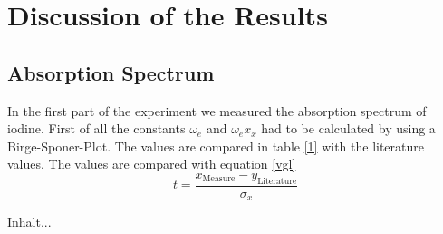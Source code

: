 \section{Discussion of the Results}
\subsection{Absorption Spectrum}
In the first part of the experiment we measured the absorption spectrum of iodine. First of all the constants $\omega_e$ and $\omega_ex_x$ had to be calculated by using a Birge-Sponer-Plot. The values are compared in table \ref{1} with the literature values. The values are compared with equation \ref{vgl}
\begin{equation}
	t=\frac{x_{\text{Measure}}-y_\text{Literature}}{\sigma_x}
\end{equation} 
\begin{table}[ht]
	Inhalt...
\end{table}